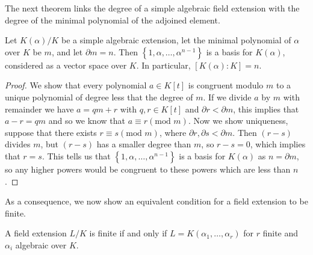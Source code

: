 The next theorem links the degree of a simple algebraic field extension with the degree of the minimal polynomial of the adjoined element. 
\begin{theorem} \label{thm:degree-theorem}
    Let $K(\alpha) / K$ be a simple algebraic extension, let the minimal polynomial of $\alpha$ over $K$ be $m$, and let $\partial m=n$. Then $\left\{1, \alpha, \ldots, \alpha^{n-1}\right\}$ is a basis for $K(\alpha)$, considered as a vector space over $K$. In particular, \([K(\alpha):K]=n\). \label{algebraic case}
\end{theorem}

\begin{proof}
    We show that every polynomial \(a \in K[t]\) is congruent modulo \(m\) to a unique polynomial of degree less that the degree of \(m\). If we divide \(a\) by \(m\) with remainder we have \(a = qm + r\) with \(q,r \in K[t]\) and \(\partial r < \partial m\), this implies that \(a - r =qm\) and so we know that \(a \equiv r (\text{mod } m)\). Now we show uniqueness, suppose that there exists \(r \equiv s(\text{mod }m)\), where \(\partial r, \partial s < \partial m\). Then \((r - s)\) divides \(m\), but \((r-s)\) has a smaller degree than \(m\), so \(r-s=0\), which implies that \(r=s\). This tells us that $\left\{1, \alpha, \ldots, \alpha^{n-1}\right\}$ is a basis for \(K(\alpha)\) as \(n = \partial m\), so any higher powers would be congruent to these powers which are less than \(n\).
    \end{proof}

%
As a consequence, we now show an equivalent condition for a field extension to be finite. 

\begin{theorem} \label{thm:finite-equi-def}
    A field extension $L/K$ is finite if and only if $L = K(\alpha_1, \dots, \alpha_r)$ for $r$ finite and $\alpha_i$ algebraic over $K$. 
\end{theorem}

